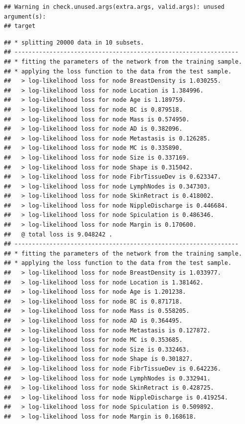 \documentclass[]{article}
\begin{document}
\begin{verbatim}
## Warning in check.unused.args(extra.args, valid.args): unused argument(s):
## target
\end{verbatim}

\begin{verbatim}
## * splitting 20000 data in 10 subsets.
## ----------------------------------------------------------------
## * fitting the parameters of the network from the training sample.
## * applying the loss function to the data from the test sample.
##   > log-likelihood loss for node BreastDensity is 1.030255.
##   > log-likelihood loss for node Location is 1.384996.
##   > log-likelihood loss for node Age is 1.189759.
##   > log-likelihood loss for node BC is 0.879518.
##   > log-likelihood loss for node Mass is 0.574950.
##   > log-likelihood loss for node AD is 0.382096.
##   > log-likelihood loss for node Metastasis is 0.126285.
##   > log-likelihood loss for node MC is 0.335890.
##   > log-likelihood loss for node Size is 0.337169.
##   > log-likelihood loss for node Shape is 0.315042.
##   > log-likelihood loss for node FibrTissueDev is 0.623347.
##   > log-likelihood loss for node LymphNodes is 0.347303.
##   > log-likelihood loss for node SkinRetract is 0.418002.
##   > log-likelihood loss for node NippleDischarge is 0.446684.
##   > log-likelihood loss for node Spiculation is 0.486346.
##   > log-likelihood loss for node Margin is 0.170600.
##   @ total loss is 9.048242 .
## ----------------------------------------------------------------
## * fitting the parameters of the network from the training sample.
## * applying the loss function to the data from the test sample.
##   > log-likelihood loss for node BreastDensity is 1.033977.
##   > log-likelihood loss for node Location is 1.381462.
##   > log-likelihood loss for node Age is 1.201238.
##   > log-likelihood loss for node BC is 0.871718.
##   > log-likelihood loss for node Mass is 0.558205.
##   > log-likelihood loss for node AD is 0.364495.
##   > log-likelihood loss for node Metastasis is 0.127872.
##   > log-likelihood loss for node MC is 0.353685.
##   > log-likelihood loss for node Size is 0.332463.
##   > log-likelihood loss for node Shape is 0.301827.
##   > log-likelihood loss for node FibrTissueDev is 0.642236.
##   > log-likelihood loss for node LymphNodes is 0.332941.
##   > log-likelihood loss for node SkinRetract is 0.428725.
##   > log-likelihood loss for node NippleDischarge is 0.419254.
##   > log-likelihood loss for node Spiculation is 0.509892.
##   > log-likelihood loss for node Margin is 0.168618.

\end{verbatim}
\end{document}
